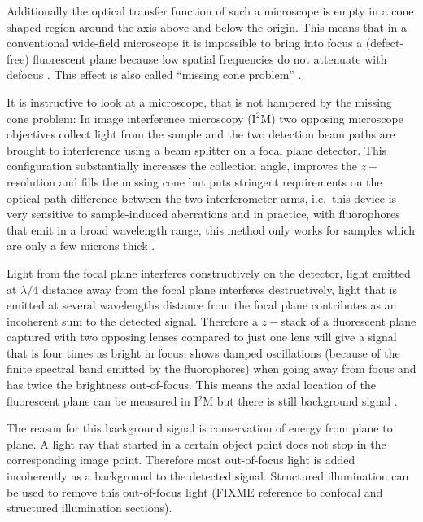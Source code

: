 Additionally the optical transfer function of such a microscope is
empty in a cone shaped region around the axis above and below the
origin.  This means that in a conventional wide-field microscope it is
impossible to bring into focus a (defect-free) fluorescent plane
because low spatial frequencies do not attenuate with defocus
\citep{Neil1997}. This effect is also called ``missing cone problem''
\citep{Streibl1984}.

It is instructive to look at a microscope, that is not hampered by the
missing cone problem: In image interference microscopy (I${}^2$M) two
opposing microscope objectives collect light from the sample and the
two detection beam paths are brought to interference using a beam
splitter on a focal plane detector. This configuration substantially
increases the collection angle, improves the $z-$resolution and fills
the missing cone but puts stringent requirements on the optical path
difference between the two interferometer arms, i.e.\ this device is
very sensitive to sample-induced aberrations and in practice, with
fluorophores that emit in a broad wavelength range, this method only
works for samples which are only a few microns thick
\citep{Gustafsson1999}.



Light from the focal plane interferes constructively on the detector,
light emitted at $\lambda/4$ distance away from the focal plane
interferes destructively, light that is emitted at several wavelengths
distance from the focal plane contributes as an incoherent sum to the
detected signal. Therefore a $z-$stack of a fluorescent plane captured
with two opposing lenses compared to just one lens will give a signal
that is four times as bright in focus, shows damped oscillations
(because of the finite spectral band emitted by the fluorophores) when
going away from focus and has twice the brightness out-of-focus. This
means the axial location of the fluorescent plane can be measured in
I${}^2$M but there is still background signal \citep{Gustafsson1995}.

The reason for this background signal is conservation of energy from
plane to plane. A light ray that started in a certain object point
does not stop in the corresponding image point. Therefore most
out-of-focus light is added incoherently as a background to the
detected signal. Structured illumination can be used to remove this
out-of-focus light \citep{Neil1997} (FIXME reference to confocal and structured
illumination sections).




